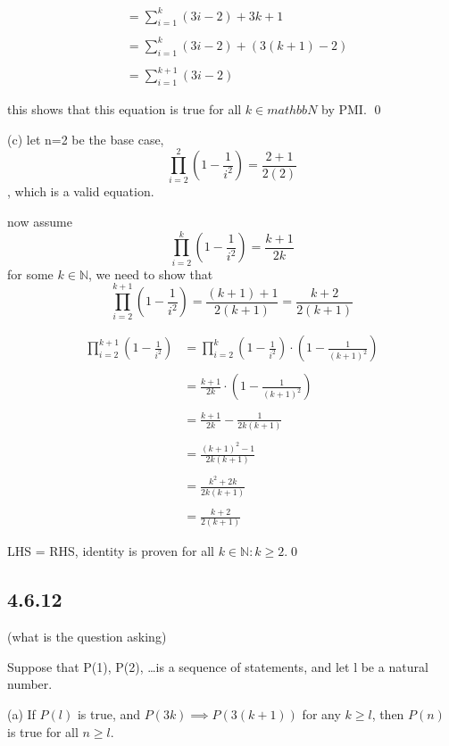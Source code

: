 \documentclass{article}
\begin{document}
$$\begin{aligned}&=\sum_{i=1}^{k}\left(3i-2\right)+3k+1\\\\&=\sum_{i=1}^{k}\left(3i-2\right)+\left(3\left(k+1\right)-2\right)\\\\&=\sum_{i=1}^{k+1}\left(3i-2\right)\end{aligned}$$

this shows that this equation is true for all $k \in mathbb{N}$ by PMI. \qed

(c) let n=2 be the base case, $$\prod_{i=2}^2\left(1-\frac1{i^2}\right)=\frac{2+1}{2(2)}$$, which is a valid equation.

now assume $$\prod_{i=2}^k\left(1-\frac1{i^2}\right)=\frac{k+1}{2k}$$ for some $k\in\mathbb{N}$, we need to show that $$\prod_{i=2}^{k+1}\left(1-\frac1{i^2}\right)=\frac{(k+1)+1}{2(k+1)}=\frac{k+2}{2(k+1)}$$

\begin{center}
    $$\begin{aligned}\prod_{i=2}^{k+1}\left(1-\frac1{i^2}\right)&=\prod_{i=2}^{k}\left(1-\frac1{i^2}\right)\cdot\left(1-\frac1{(k+1)^2}\right)\\\\&=\frac{k+1}{2k}\cdot\left(1-\frac1{(k+1)^2}\right)\\\\&=\frac{k+1}{2k}-\frac1{2k(k+1)}\\\\&=\frac{(k+1)^2-1}{2k(k+1)}\\\\&=\frac{k^2+2k}{2k(k+1)}\\\\&=\frac{k+2}{2(k+1)}\end{aligned}$$
\end{center}

LHS = RHS, identity is proven for all $k\in\mathbb{N}: k \geq 2$.\qed

\subsection*{4.6.12}

(what is the question asking)

Suppose that P(1), P(2), \ldots is a sequence of statements, and let l be a natural number.

(a) If $P(l)$ is true, and $P(3k)\implies P(3(k+1))$ for any $k\geq l$, then $P(n)$ is true for all $n\geq l$.
\end{document}
